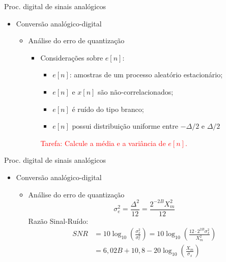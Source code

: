 \documentclass[
size=11pt,
paper=screen,
mode=present,
display=slidesnotes,
style=paintings,
nopagebreaks,
blackslide,
fleqn]{powerdot}
\begin{document}
\begin{slide}{Proc. digital de sinais anal\'ogicos}
\begin{itemize}
   \item Conversão analógico-digital
   \begin{itemize}
      \item Análise do erro de quantização
      \begin{itemize}
         \item Considerações sobre $e[n]$:
         \begin{itemize}
             \item $e[n]$: amostras de um processo aleatório estacionário;
             \item $e[n]$ e $x[n]$ são não-correlacionados;
             \item $e[n]$ é ruído do tipo branco;
             \item $e[n]$ possui distribuição uniforme entre $-\Delta /2$ e $\Delta /2$
         \end{itemize}
         \textcolor{red}{Tarefa: Calcule a média e a variância de $e[n]$.}
      \end{itemize}

   \end{itemize}
\end{itemize}
\end{slide}
\begin{slide}{Proc. digital de sinais anal\'ogicos}
\begin{itemize}
   \item Conversão analógico-digital
   \begin{itemize}
      \item Análise do erro de quantização
       \begin{equation}
        \sigma^2_e = \frac{\Delta^2}{12} = \frac{2^{-2B}X_m^2}{12}
      \end{equation}
      Razão Sinal-Ruído:
     \begin{align*}
         SNR &= 10\log_{10}\left ( \frac{\sigma_x^2}{\sigma_e^2} \right )= 10\log_{10}\left ( \frac{12\cdot 2^{2B}\sigma_x^2}{X_m^2} \right )\\
                 &= 6,02 B + 10,8-20\log_{10}\left(\frac{X_m}{\sigma_x} \right )
     \end{align*}


   \end{itemize}
\end{itemize}
\end{slide}
\end{document}
